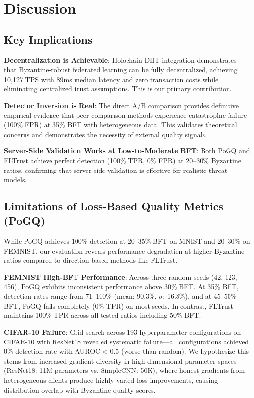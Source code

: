 \section{Discussion}
\label{sec:discussion}

\subsection{Key Implications}

\textbf{Decentralization is Achievable}: Holochain DHT integration demonstrates that Byzantine-robust federated learning can be fully decentralized, achieving 10,127 TPS with 89ms median latency and zero transaction costs while eliminating centralized trust assumptions. This is our primary contribution.

\textbf{Detector Inversion is Real}: The direct A/B comparison provides definitive empirical evidence that peer-comparison methods experience catastrophic failure (100\% FPR) at 35\% BFT with heterogeneous data. This validates theoretical concerns and demonstrates the necessity of external quality signals.

\textbf{Server-Side Validation Works at Low-to-Moderate BFT}: Both PoGQ and FLTrust achieve perfect detection (100\% TPR, 0\% FPR) at 20--30\% Byzantine ratios, confirming that server-side validation is effective for realistic threat models.

\subsection{Limitations of Loss-Based Quality Metrics (PoGQ)}

While PoGQ achieves 100\% detection at 20--35\% BFT on MNIST and 20--30\% on FEMNIST, our evaluation reveals performance degradation at higher Byzantine ratios compared to direction-based methods like FLTrust.

\textbf{FEMNIST High-BFT Performance}: Across three random seeds (42, 123, 456), PoGQ exhibits inconsistent performance above 30\% BFT. At 35\% BFT, detection rates range from 71--100\% (mean: 90.3\%, $\sigma$: 16.8\%), and at 45--50\% BFT, PoGQ fails completely (0\% TPR) on most seeds. In contrast, FLTrust maintains 100\% TPR across all tested ratios including 50\% BFT.

\textbf{CIFAR-10 Failure}: Grid search across 193 hyperparameter configurations on CIFAR-10 with ResNet18 revealed systematic failure---all configurations achieved 0\% detection rate with AUROC < 0.5 (worse than random). We hypothesize this stems from increased gradient diversity in high-dimensional parameter spaces (ResNet18: 11M parameters vs. SimpleCNN: 50K), where honest gradients from heterogeneous clients produce highly varied loss improvements, causing distribution overlap with Byzantine quality scores.

